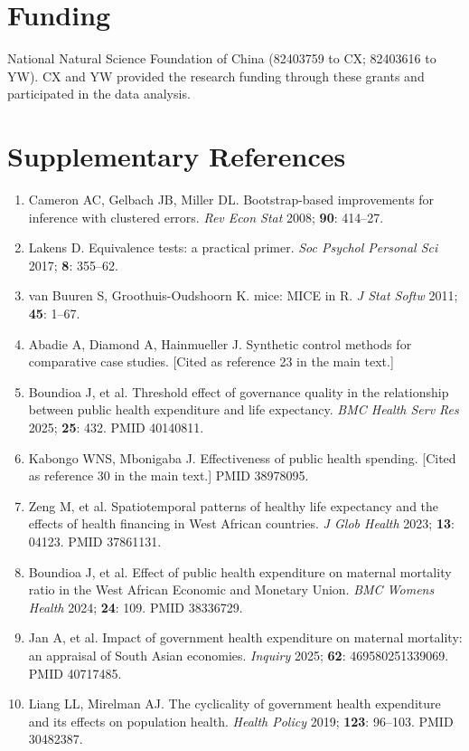 \documentclass[10pt,a4paper]{article}
\begin{document}
\section*{Funding}
National Natural Science Foundation of China (82403759 to CX; 82403616 to YW). CX and YW provided the research funding through these grants and participated in the data analysis.

\section*{Supplementary References}
\begin{enumerate}[leftmargin=*, label=S\arabic*.]
\item[S1.] Cameron AC, Gelbach JB, Miller DL. Bootstrap-based improvements for inference with clustered errors. \textit{Rev Econ Stat} 2008; \textbf{90}: 414--27.
\item[S2.] Lakens D. Equivalence tests: a practical primer. \textit{Soc Psychol Personal Sci} 2017; \textbf{8}: 355--62.
\item[S3.] van Buuren S, Groothuis-Oudshoorn K. mice: MICE in R. \textit{J Stat Softw} 2011; \textbf{45}: 1--67.
\item[S4.] Abadie A, Diamond A, Hainmueller J. Synthetic control methods for comparative case studies. [Cited as reference 23 in the main text.]
\item[S5.] Boundioa J, et al. Threshold effect of governance quality in the relationship between public health expenditure and life expectancy. \textit{BMC Health Serv Res} 2025; \textbf{25}: 432. PMID 40140811.
\item[S6.] Kabongo WNS, Mbonigaba J. Effectiveness of public health spending. [Cited as reference 30 in the main text.] PMID 38978095.
\item[S7.] Zeng M, et al. Spatiotemporal patterns of healthy life expectancy and the effects of health financing in West African countries. \textit{J Glob Health} 2023; \textbf{13}: 04123. PMID 37861131.
\item[S8.] Boundioa J, et al. Effect of public health expenditure on maternal mortality ratio in the West African Economic and Monetary Union. \textit{BMC Womens Health} 2024; \textbf{24}: 109. PMID 38336729.
\item[S9.] Jan A, et al. Impact of government health expenditure on maternal mortality: an appraisal of South Asian economies. \textit{Inquiry} 2025; \textbf{62}: 469580251339069. PMID 40717485.
\item[S10.] Liang LL, Mirelman AJ. The cyclicality of government health expenditure and its effects on population health. \textit{Health Policy} 2019; \textbf{123}: 96--103. PMID 30482387.

\end{enumerate}
\end{document}
